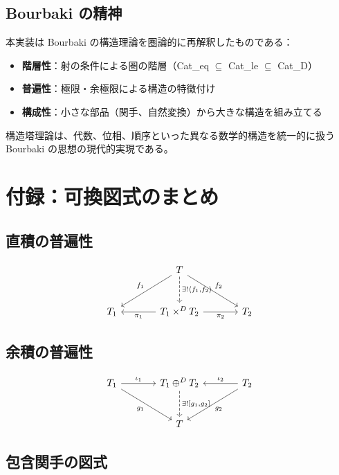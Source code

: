 \documentclass[a4paper,11pt]{ltjsarticle}
\theoremstyle{definition}
\begin{document}
\subsection{Bourbaki の精神}

本実装は Bourbaki の構造理論を圏論的に再解釈したものである：
\begin{itemize}
  \item \textbf{階層性}：射の条件による圏の階層（Cat\_eq $\subseteq$ Cat\_le $\subseteq$ Cat\_D）
  \item \textbf{普遍性}：極限・余極限による構造の特徴付け
  \item \textbf{構成性}：小さな部品（関手、自然変換）から大きな構造を組み立てる
\end{itemize}

構造塔理論は、代数、位相、順序といった異なる数学的構造を統一的に扱う
Bourbaki の思想の現代的実現である。

\section*{付録：可換図式のまとめ}

\subsection*{直積の普遍性}

\[
\begin{tikzcd}[row sep=large, column sep=large]
  & T \arrow[ld, "f_1"'] \arrow[rd, "f_2"] \arrow[d, dashed, "{\exists! \langle f_1, f_2 \rangle}"] & \\
T_1 & T_1 \times^D T_2 \arrow[l, "\pi_1"] \arrow[r, "\pi_2"'] & T_2
\end{tikzcd}
\]

\subsection*{余積の普遍性}

\[
\begin{tikzcd}[row sep=large, column sep=large]
T_1 \arrow[r, "\iota_1"] \arrow[rd, "g_1"'] & T_1 \oplus^D T_2 \arrow[d, dashed, "{\exists! [g_1, g_2]}"] & T_2 \arrow[l, "\iota_2"'] \arrow[ld, "g_2"] \\
  & T &
\end{tikzcd}
\]

\subsection*{包含関手の図式}
\end{document}
